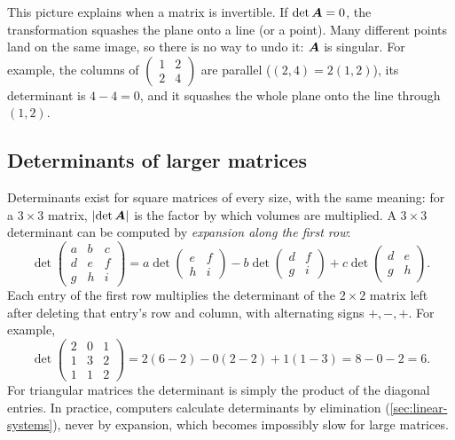 This picture explains when a matrix is invertible. If $\det\bm{A} = 0$, the
transformation squashes the plane onto a line (or a point). Many different
points land on the same image, so there is no way to undo it: $\bm{A}$ is
singular. For example, the columns of
$\left(\begin{smallmatrix} 1 & 2\\ 2 & 4\end{smallmatrix}\right)$ are parallel
($(2, 4) = 2(1, 2)$), its determinant is $4 - 4 = 0$, and it squashes the
whole plane onto the line through $(1, 2)$.

\subsection{Determinants of larger matrices}

Determinants exist for square matrices of every size, with the same meaning:
for a $3\times3$ matrix, $\lvert\det\bm{A}\rvert$ is the factor by which volumes are
multiplied. A $3 \times 3$ determinant can be computed by \emph{expansion
along the first row}:
\[
  \det\begin{pmatrix} a & b & c\\ d & e & f\\ g & h & i\end{pmatrix}
  = a\det\begin{pmatrix} e & f\\ h & i\end{pmatrix}
  - b\det\begin{pmatrix} d & f\\ g & i\end{pmatrix}
  + c\det\begin{pmatrix} d & e\\ g & h\end{pmatrix}.
\]
Each entry of the first row multiplies the determinant of the $2\times2$
matrix left after deleting that entry's row and column, with alternating signs
$+, -, +$. For example,
\[
  \det\begin{pmatrix} 2 & 0 & 1\\ 1 & 3 & 2\\ 1 & 1 & 2\end{pmatrix}
  = 2(6 - 2) - 0(2 - 2) + 1(1 - 3) = 8 - 0 - 2 = 6 .
\]
For triangular matrices the determinant is simply the product of the diagonal
entries. In practice, computers calculate determinants by elimination
(\cref{sec:linear-systems}), never by expansion, which becomes impossibly slow
for large matrices.

